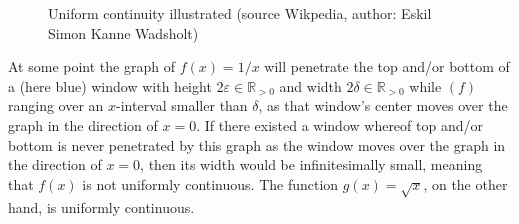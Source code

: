 \begin{figure}[H]
		\vspace*{3mm}
		\caption[Uniform continuity illustrated]{Uniform continuity illustrated (source Wikpedia, author: Eskil Simon Kanne Wadsholt)}
	\end{figure}
	At some point the graph of $f(x)=1/x$ will penetrate the top and/or bottom of a (here blue) window with height $2 \varepsilon \in \mathbb{R}_{>0}$ and width $2 \delta \in \mathbb{R}_{>0}$ while $(f)$ ranging over an $x$-interval smaller than $\delta$, as that window's center moves over the graph in the direction of $x=0$. If there existed a window whereof top and/or bottom is never penetrated by this graph as the window moves over the graph in the direction of $x=0$, then its width would be infinitesimally small, meaning that $f(x)$ is not uniformly continuous. The function $g(x)=\sqrt{x}$, on the other hand, is uniformly continuous.

